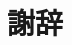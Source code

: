\documentclass[11pt,dvipdfmx]{jreport}
\begin{document}
\chapter*{謝辞}











% 
% 
% 

\end{document}
